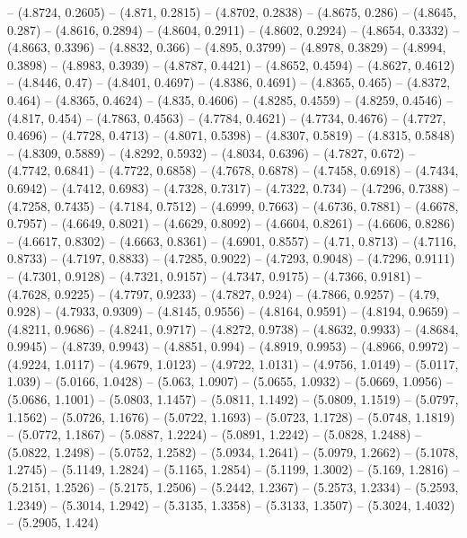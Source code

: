 {  -- (4.8724, 0.2605) -- (4.871, 0.2815) -- (4.8702, 0.2838) -- (4.8675, 0.286) 
  -- (4.8645, 0.287) -- (4.8616, 0.2894) -- (4.8604, 0.2911) -- (4.8602, 0.2924)
   -- (4.8654, 0.3332) -- (4.8663, 0.3396) -- (4.8832, 0.366) -- (4.895, 0.3799)
   -- (4.8978, 0.3829) -- (4.8994, 0.3898) -- (4.8983, 0.3939) -- (4.8787, 
  0.4421) -- (4.8652, 0.4594) -- (4.8627, 0.4612) -- (4.8446, 0.47) -- (4.8401, 
  0.4697) -- (4.8386, 0.4691) -- (4.8365, 0.465) -- (4.8372, 0.464) -- (4.8365, 
  0.4624) -- (4.835, 0.4606) -- (4.8285, 0.4559) -- (4.8259, 0.4546) -- (4.817, 
  0.454) -- (4.7863, 0.4563) -- (4.7784, 0.4621) -- (4.7734, 0.4676) -- (4.7727,
   0.4696) -- (4.7728, 0.4713) -- (4.8071, 0.5398) -- (4.8307, 0.5819) -- 
  (4.8315, 0.5848) -- (4.8309, 0.5889) -- (4.8292, 0.5932) -- (4.8034, 0.6396) 
  -- (4.7827, 0.672) -- (4.7742, 0.6841) -- (4.7722, 0.6858) -- (4.7678, 0.6878)
   -- (4.7458, 0.6918) -- (4.7434, 0.6942) -- (4.7412, 0.6983) -- (4.7328, 
  0.7317) -- (4.7322, 0.734) -- (4.7296, 0.7388) -- (4.7258, 0.7435) -- (4.7184,
   0.7512) -- (4.6999, 0.7663) -- (4.6736, 0.7881) -- (4.6678, 0.7957) -- 
  (4.6649, 0.8021) -- (4.6629, 0.8092) -- (4.6604, 0.8261) -- (4.6606, 0.8286) 
  -- (4.6617, 0.8302) -- (4.6663, 0.8361) -- (4.6901, 0.8557) -- (4.71, 0.8713) 
  -- (4.7116, 0.8733) -- (4.7197, 0.8833) -- (4.7285, 0.9022) -- (4.7293, 
  0.9048) -- (4.7296, 0.9111) -- (4.7301, 0.9128) -- (4.7321, 0.9157) -- 
  (4.7347, 0.9175) -- (4.7366, 0.9181) -- (4.7628, 0.9225) -- (4.7797, 0.9233) 
  -- (4.7827, 0.924) -- (4.7866, 0.9257) -- (4.79, 0.928) -- (4.7933, 0.9309) --
   (4.8145, 0.9556) -- (4.8164, 0.9591) -- (4.8194, 0.9659) -- (4.8211, 0.9686) 
  -- (4.8241, 0.9717) -- (4.8272, 0.9738) -- (4.8632, 0.9933) -- (4.8684, 
  0.9945) -- (4.8739, 0.9943) -- (4.8851, 0.994) -- (4.8919, 0.9953) -- (4.8966,
   0.9972) -- (4.9224, 1.0117) -- (4.9679, 1.0123) -- (4.9722, 1.0131) -- 
  (4.9756, 1.0149) -- (5.0117, 1.039) -- (5.0166, 1.0428) -- (5.063, 1.0907) -- 
  (5.0655, 1.0932) -- (5.0669, 1.0956) -- (5.0686, 1.1001) -- (5.0803, 1.1457) 
  -- (5.0811, 1.1492) -- (5.0809, 1.1519) -- (5.0797, 1.1562) -- (5.0726, 
  1.1676) -- (5.0722, 1.1693) -- (5.0723, 1.1728) -- (5.0748, 1.1819) -- 
  (5.0772, 1.1867) -- (5.0887, 1.2224) -- (5.0891, 1.2242) -- (5.0828, 1.2488) 
  -- (5.0822, 1.2498) -- (5.0752, 1.2582) -- (5.0934, 1.2641) -- (5.0979, 
  1.2662) -- (5.1078, 1.2745) -- (5.1149, 1.2824) -- (5.1165, 1.2854) -- 
  (5.1199, 1.3002) -- (5.169, 1.2816) -- (5.2151, 1.2526) -- (5.2175, 1.2506) --
   (5.2442, 1.2367) -- (5.2573, 1.2334) -- (5.2593, 1.2349) -- (5.3014, 1.2942) 
  -- (5.3135, 1.3358) -- (5.3133, 1.3507) -- (5.3024, 1.4032) -- (5.2905, 1.424)
}
